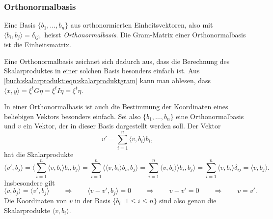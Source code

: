\subsubsection{Orthonormalbasis}
Eine Basis $\{b_1,\dots,b_n\}$ aus orthonormierten Einheitsvektoren,
also mit
$
\langle b_i,b_j\rangle=\delta_{i\!j},
$
heisst {\em Orthonormalbasis}.
%
Die Gram-Matrix einer Orthonormalbasis ist die Einheitsmatrix.

Eine Orthonormalbasis zeichnet sich dadurch aus, dass die Berechnung
des Skalarproduktes in einer solchen Basis besonders einfach ist.
Aus \eqref{buch:skalarprodukt:eqn:skalarproduktgram} kann man ablesen,
dass $\langle x,y\rangle = \xi^t G \eta = \xi^t I \eta = \xi^t\eta$.

In einer Orthonormalbasis ist auch die Bestimmung der Koordinaten
eines beliebigen Vektors besonders einfach.
Sei also $\{b_1,\dots,b_n\}$ eine Orthonormalbasis und $v$ ein
Vektor, der in dieser Basis dargestellt werden soll.
Der Vektor
\begin{equation}
v'=\sum_{i=1}^n \langle v,b_i\rangle b_i,
\label{buch:grundlagen:eqn:koordinaten-in-orthonormalbasis}
\end{equation}
hat die Skalarprodukte
\[
\langle v',b_j\rangle=
\biggl\langle \sum_{i=1}^n \langle v,b_i\rangle b_i,b_j\biggr\rangle
=
\sum_{i=1}^n \bigl\langle \langle v,b_i\rangle b_i, b_j\bigr\rangle
=
\sum_{i=1}^n \langle v,b_i\rangle \rangle b_i, b_j\rangle
=
\sum_{i=1}^n \langle v,b_i\rangle \delta_{i\!j}
=
\langle v,b_j\rangle.
\]
Insbesondere gilt 
\[
\langle v,b_j\rangle = \langle v',b_j\rangle
\qquad\Rightarrow\qquad
\langle v-v',b_j\rangle = 0
\qquad\Rightarrow\qquad
v-v'=0
\qquad\Rightarrow\qquad
v=v'.
\]
Die Koordinaten von $v$ in der Basis $\{b_i\,|\,1\le i\le n\}$
sind also genau die Skalarprodukte $\langle v,b_i\rangle$.

